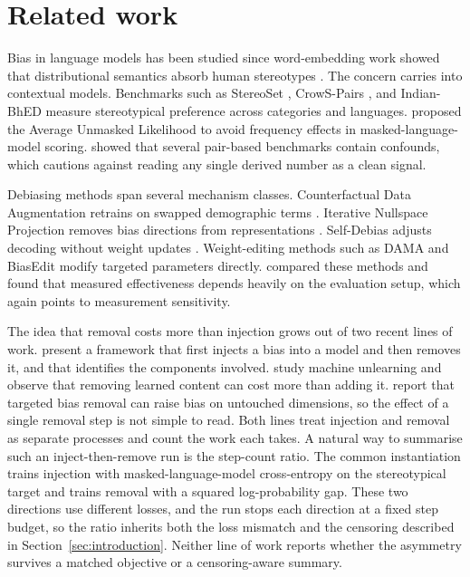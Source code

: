 \documentclass[Afour,sageh,times]{sagej}
\begin{document}
\section{Related work}
\label{sec:related}

Bias in language models has been studied since word-embedding work showed that distributional semantics absorb human stereotypes \citep{caliskan2017semantics, bolukbasi2016man}. The concern carries into contextual models. Benchmarks such as StereoSet \citep{nadeem2021stereoset}, CrowS-Pairs \citep{nangia2020crowspairs}, and Indian-BhED \citep{khandelwal2023indianbhed} measure stereotypical preference across categories and languages. \citet{kaneko2022unmasking} proposed the Average Unmasked Likelihood to avoid frequency effects in masked-language-model scoring. \citet{blodgett2021stereotyping} showed that several pair-based benchmarks contain confounds, which cautions against reading any single derived number as a clean signal.

Debiasing methods span several mechanism classes. Counterfactual Data Augmentation retrains on swapped demographic terms \citep{zmigrod2019counterfactual}. Iterative Nullspace Projection removes bias directions from representations \citep{ravfogel2020null}. Self-Debias adjusts decoding without weight updates \citep{schick2021selfdiagnosis}. Weight-editing methods such as DAMA \citep{limisiewicz2024dama} and BiasEdit \citep{xu2025biasedit} modify targeted parameters directly. \citet{meade2022empirical} compared these methods and found that measured effectiveness depends heavily on the evaluation setup, which again points to measurement sensitivity.

The idea that removal costs more than injection grows out of two recent lines of work. \citet{islam2025biasgym} present a framework that first injects a bias into a model and then removes it, and that identifies the components involved. \citet{liu2025rethinking} study machine unlearning and observe that removing learned content can cost more than adding it. \citet{chand2025nofreelunch} report that targeted bias removal can raise bias on untouched dimensions, so the effect of a single removal step is not simple to read. Both lines treat injection and removal as separate processes and count the work each takes. A natural way to summarise such an inject-then-remove run is the step-count ratio. The common instantiation trains injection with masked-language-model cross-entropy on the stereotypical target and trains removal with a squared log-probability gap. These two directions use different losses, and the run stops each direction at a fixed step budget, so the ratio inherits both the loss mismatch and the censoring described in Section~\ref{sec:introduction}. Neither line of work reports whether the asymmetry survives a matched objective or a censoring-aware summary.
\end{document}
